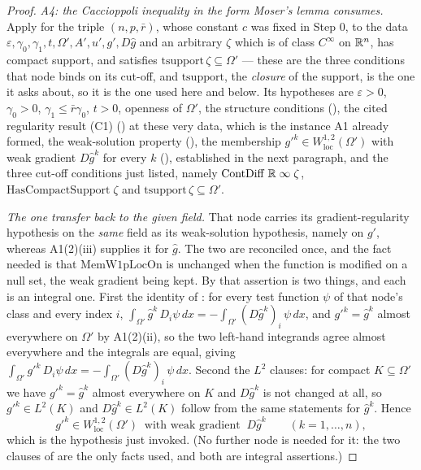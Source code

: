 \begin{proof}
\emph{A4: the Caccioppoli inequality in the form Moser's lemma consumes.}
Apply  for the triple $(n,p,\bar r)$, whose
constant $c$ was fixed in Step 0, to the data
$\varepsilon,\gamma_0,\gamma_1,t,\Omega',A',u',g',D\hat g$ and an arbitrary
$\zeta$ which is of class $C^\infty$ on $\mathbb{R}^n$, has compact support, and
satisfies $\mathrm{tsupport}\,\zeta\subseteq\Omega'$ --- these are the three
conditions that node binds on its cut-off, and $\mathrm{tsupport}$, the
\emph{closure} of the support, is the one it asks about, so it is the one used
here and below.  Its hypotheses are $\varepsilon>0$,
$\gamma_0>0$, $\gamma_1\le\bar r\gamma_0$, $t>0$, openness of $\Omega'$, the
structure conditions (), the cited regularity
result (C1) () at these very data, which is the
instance A1 already formed, the weak-solution property
(), the membership
$g'^k\in W^{1,2}_{\mathrm{loc}}(\Omega')$ with weak gradient $D\hat g^k$ for
every $k$ (), established in the next paragraph, and the
three cut-off conditions
just listed, namely $\mathrm{ContDiff}\;\mathbb{R}\;\infty\;\zeta$,
$\mathrm{HasCompactSupport}\;\zeta$ and
$\mathrm{tsupport}\,\zeta\subseteq\Omega'$.

\emph{The one transfer back to the given field.}  That node carries its
gradient-regularity hypothesis on the \emph{same} field as its weak-solution
hypothesis, namely on $g'$, whereas A1(2)(iii) supplies it for $\hat g$.  The
two are reconciled once, and the fact needed is that
$\mathrm{MemW1pLocOn}$ is unchanged when the function is modified on a null set,
the weak gradient being kept.  By  that assertion is two
things, and each is an integral one.  First the identity of
: for every test function $\psi$ of that node's class
and every index $i$,
$\int_{\Omega'}\hat g^k\,D_i\psi\,dx=-\int_{\Omega'}(D\hat g^k)_i\,\psi\,dx$,
and $g'^k=\hat g^k$ almost everywhere on $\Omega'$ by A1(2)(ii), so the two
left-hand integrands agree almost everywhere and the integrals are equal,
giving $\int_{\Omega'}g'^k\,D_i\psi\,dx=-\int_{\Omega'}(D\hat g^k)_i\,\psi\,dx$.
Second the $L^2$ clauses: for compact $K\subseteq\Omega'$ we have
$g'^k=\hat g^k$ almost everywhere on $K$ and $D\hat g^k$ is not changed at all,
so $g'^k\in L^2(K)$ and $D\hat g^k\in L^2(K)$ follow from the same statements
for $\hat g^k$.  Hence
\[
g'^k\in W^{1,2}_{\mathrm{loc}}(\Omega')\ \text{ with weak gradient }\ D\hat g^k
\qquad(k=1,\dots,n),
\tag{A4a}
\]
which is the hypothesis just invoked.  (No further node is needed for it: the
two clauses of  are the only facts used, and both are
integral assertions.)


\end{proof}
